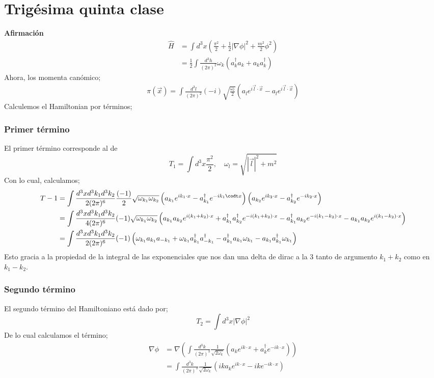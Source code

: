 \documentclass[../main.tex]{subfiles}
\begin{document}
\section{Trigésima quinta clase}
\textbf{Afirmación}
\begin{align*}
  \hat{H} & = \int d^3x \left( \frac{\pi^2}{2} + \frac{1}{2}|\nabla \phi|^2 + \frac{m^2}{2}\phi^2 \right) \\
  & = \frac{1}{2} \int \frac{d^3h}{(2\pi)^2} \omega_k \left( a^\dagger_k a_k + a_k a^\dagger_k \right)
\end{align*}
Ahora, los momenta canómico;
\begin{align*}
  \pi(\vec{x}) = \int \frac{d^3l}{(2\pi)^2} (-i) \sqrt{\frac{\omega_l}{2}} \left( a_l e^{i\vec{l}\cdot \vec{x}} - a_l e^{i\vec{l}\cdot \vec{x}} \right) 
\end{align*}
Calculemos el Hamiltonian por términos;
\subsubsection{Primer término}
El primer término corresponde al de
\begin{equation*}
  T_1 = \int d^3x \frac{\pi^2}{2}, \quad \omega_l  = \sqrt{|\vec{l}|^2 + m^2}
\end{equation*}
Con lo cual, calculamos;
\begin{align*}
  T-1 & = \int \frac{d^3xd^3k_1d^3k_2}{2(2\pi)^6}\frac{(-1)}{2} \sqrt{\omega_{k_1}\omega_{k_2}}  \left( a_{k_1} e^{ik_1\cdot x} - a^\dagger_{k_1} e^{-ik_1\codt x} \right) \left( a_{k_2}e^{ik_2 \cdot x} - a^\dagger_{k_2} e^{-ik_2\cdot x} \right) \\
  & = \int \frac{d^3xd^3k_1d^3k_2}{4(2\pi)^6} (-1) \sqrt{\omega_{k_1}\omega_{k_2}} \left( a_{k_1}a_{k_2} e^{i(k_1+k_2)\cdot x} + a^\dagger_{k_1}a^\dagger_{k_2} e^{-i(k_1 + k_2)\cdot x} - a^\dagger_{k_1}a_{k_2} e^{-i(k_1-k_2)\cdot x} - a_{k_1}a_{k_2} e^{i(k_1 - k_2)\cdot x} \right) \\
  & = \int \frac{d^3xd^3k_1d^3k_2}{2(2\pi)^6} (-1) \left( \omega_{k_1}a_{k_1} a_{-k_1} + \omega_{k_1} a^\dagger_{k_1}a^\dagger_{-k_1} - a^\dagger_{k_1} a_{k_1} \omega_{k_1} - a_{k_1}a^\dagger_{k_1} \omega_{k_1} \right)
\end{align*} 
Esto gracia a la propiedad de la integral de las exponenciales que nos dan una delta de dirac a la 3 tanto de argumento $k_1+k_2$ como en $k_1-k_2$.
\subsubsection{Segundo término}
El segundo término del Hamiltoniano está dado por;
\begin{equation*}
  T_2 = \int d^3x |\nabla \phi|^2
\end{equation*}
De lo cual calculamos el término;
\begin{align*}
  \nabla \phi & = \nabla \left( \int \frac{d^3k}{(2\pi)^3} \frac{1}{\sqrt{2\omega_k}} \left( a_k e^{ik\cdot x} + a^\dagger_ke^{-ik \cdot x} \right)\right) \\
  & = \int \frac{d^3k}{(2\pi)^3} \frac{1}{\sqrt{2\omega_k}} \left( ik a_k e^{ik\cdot x} - ik e^{-ik\cdot x}\right)
\end{align*}
\end{document}
